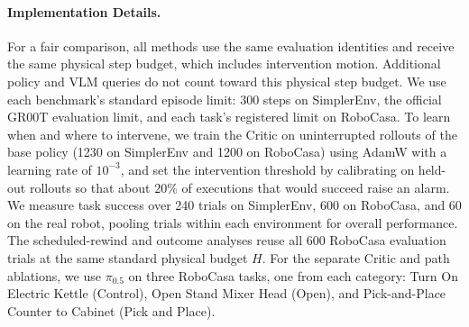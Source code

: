 \paragraph{Implementation Details.}
For a fair comparison, all methods use the same evaluation identities and receive the same physical step budget, which includes intervention motion. Additional policy and VLM queries do not count toward this physical step budget. We use each benchmark's standard episode limit: 300 steps on SimplerEnv, the official GR00T evaluation limit, and each task's registered limit on RoboCasa. To learn when and where to intervene, we train the Critic on uninterrupted rollouts of the base policy (1230 on SimplerEnv and 1200 on RoboCasa) using AdamW with a learning rate of $10^{-3}$, and set the intervention threshold by calibrating on held-out rollouts so that about 20\% of executions that would succeed raise an alarm. We measure task success over 240 trials on SimplerEnv, 600 on RoboCasa, and 60 on the real robot, pooling trials within each environment for overall performance. The scheduled-rewind and outcome analyses reuse all 600 RoboCasa evaluation trials at the same standard physical budget $H$. For the separate Critic and path ablations, we use $\pi_{0.5}$ on three RoboCasa tasks, one from each category: Turn On Electric Kettle (Control), Open Stand Mixer Head (Open), and Pick-and-Place Counter to Cabinet (Pick and Place).
